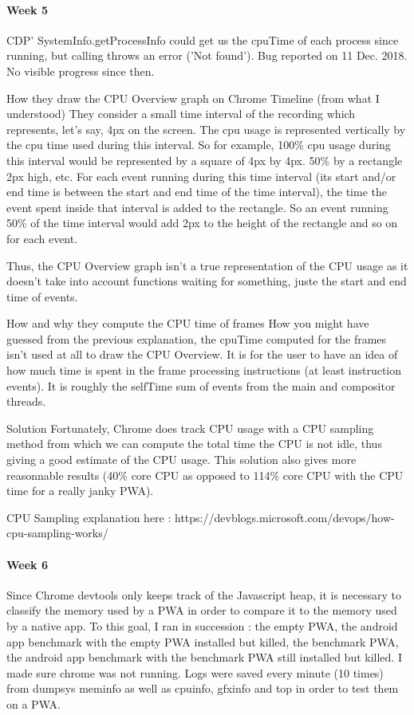 \documentclass{kththesis}
\begin{document}
\paragraph{Week 5}
CDP' SystemInfo.getProcessInfo could get us the cpuTime of each process since running, but calling throws an error ('Not found'). Bug reported on 11 Dec. 2018. No visible progress since then. 

How they draw the CPU Overview graph on Chrome Timeline (from what I understood)
   They consider a small time interval of the recording which represents, let's say, 4px on the screen. The cpu usage is represented vertically by the cpu time used during this interval. So for example, 100\% cpu usage during this interval would be represented by a square of 4px by 4px. 50\% by a rectangle 2px high, etc.  For each event running during this time interval (its start and/or end time is between the start and end time of the time interval), the time the event spent inside that interval is added to the rectangle. So an event running 50\% of the time interval would add 2px to the height of the rectangle and so on for each event. 

Thus, the CPU Overview graph isn't a true representation of the CPU usage as it doesn't take into account functions waiting for something, juste the start and end time of events. 

How and why they compute the CPU time of frames
    How you might have guessed from the previous explanation, the cpuTime computed for the frames isn't used at all to draw the CPU Overview. It is for the user to have an idea of how much time is spent in the frame processing instructions (at least instruction events). It is roughly the selfTime sum of events from the main and compositor threads. 

Solution
    Fortunately, Chrome does track CPU usage with a CPU sampling method from which we can compute the total time the CPU is not idle, thus giving a good estimate of the CPU usage.
This solution also gives more reasonnable results (40\% core CPU as opposed to 114\% core CPU with the CPU time for a really janky PWA).

CPU Sampling explanation here : https://devblogs.microsoft.com/devops/how-cpu-sampling-works/

\paragraph{Week 6}
Since Chrome devtools only keeps track of the Javascript heap, it is necessary to classify the memory used by a PWA in order to compare it to the memory used by a native app.
To this goal, I ran in succession : the empty PWA, the android app benchmark with the empty PWA installed but killed, the benchmark PWA, the android app benchmark with the benchmark PWA still installed but killed. I made sure chrome was not running. Logs were saved every minute (10 times) from dumpsys meminfo as well as cpuinfo, gfxinfo and top in order to test them on a PWA. 
\end{document}
